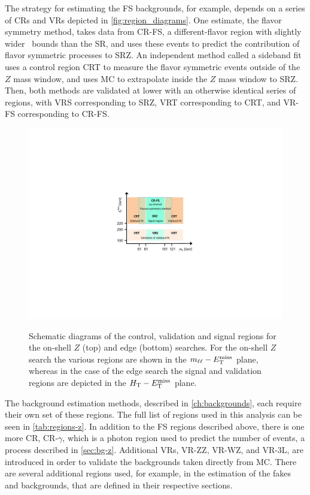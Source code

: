 The strategy for estimating the \ac{FS} backgrounds, for example, depends on a series of \acp{CR} and \acp{VR} depicted in \autoref{fig:region_diagrams}. One estimate, the flavor symmetry method, takes data from CR-FS, a different-flavor region with slightly wider \mll~bounds than the \ac{SR}, and uses these events to predict the contribution of flavor symmetric processes to SRZ. An independent method called a sideband fit uses a control region CRT to measure the flavor symmetric events outside of the $Z$ mass window, and uses \ac{MC} to extrapolate inside the $Z$ mass window to SRZ. Then, both methods are validated at lower \met with an otherwise identical series of regions, with VRS corresponding to SRZ, VRT corresponding to CRT, and VR-FS corresponding to CR-FS. 

\begin{figure}[h]
\centering
\includegraphics[width=.8\textwidth]{figures/fs/FSdiagram_v2.pdf}\\
\caption{
Schematic diagrams of the control, validation and signal regions for the on-shell $Z$ (top) and edge (bottom) searches.
For the on-shell $Z$ search the various regions are shown in the $m_{\ell\ell}-E_{\text{T}}^{\text{miss}}$ plane, whereas in the case of the edge search the
signal and validation regions are depicted in the $H_{\text{T}}-E_{\text{T}}^{\text{miss}}$ plane.
\label{fig:region_diagrams}
}
\end{figure}

The background estimation methods, described in \autoref{ch:backgrounds}, each require their own set of these regions. The full list of regions used in this analysis can be seen in \autoref{tab:regions-z}. In addition to the \ac{FS} regions described above, there is one more \ac{CR}, CR-$\gamma$, which is a photon region used to predict the number of \dyjets events, a process described in \autoref{sec:bg-z}. Additional \acp{VR}, VR-ZZ, VR-WZ, and VR-3L, are introduced in order to validate the backgrounds taken directly from \ac{MC}. There are several additional regions used, for example, in the estimation of the fakes and \dyjets backgrounds, that are defined in their respective sections. 

